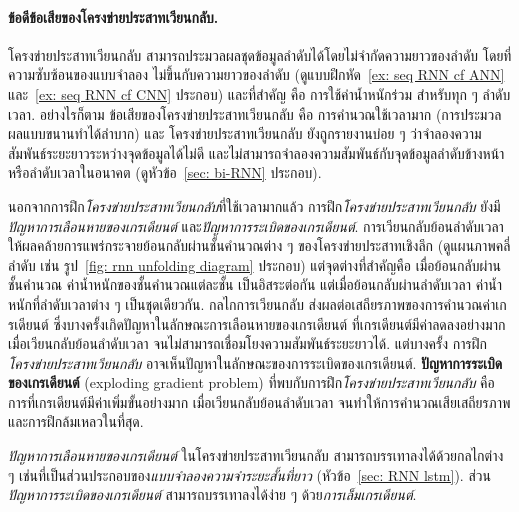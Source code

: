 \paragraph{ข้อดีข้อเสียของโครงข่ายประสาทเวียนกลับ.}
โครงข่ายประสาทเวียนกลับ
สามารถประมวลผลชุดข้อมูลลำดับได้โดยไม่จำกัดความยาวของลำดับ
โดยที่ความซับซ้อนของแบบจำลอง ไม่ขึ้นกับความยาวของลำดับ (ดูแบบฝึกหัด~\ref{ex: seq RNN cf ANN} และ~\ref{ex: seq RNN cf CNN} ประกอบ)
และที่สำคัญ คือ การใช้ค่าน้ำหนักร่วม สำหรับทุก ๆ ลำดับเวลา.
อย่างไรก็ตาม ข้อเสียของโครงข่ายประสาทเวียนกลับ 
คือ การคำนวณใช้เวลามาก (การประมวลผลแบบขนานทำได้ลำบาก)
และ
โครงข่ายประสาทเวียนกลับ 
ยังถูกรายงานบ่อย ๆ ว่าจำลองความสัมพันธ์ระยะยาวระหว่างจุดข้อมูลได้ไม่ดี
และไม่สามารถจำลองความสัมพันธ์กับจุดข้อมูลลำดับข้างหน้า หรือลำดับเวลาในอนาคต (ดูหัวข้อ~\ref{sec: bi-RNN} ประกอบ).

นอกจากการฝึก\textit{โครงข่ายประสาทเวียนกลับ}ที่ใช้เวลามากแล้ว
การฝึก\textit{โครงข่ายประสาทเวียนกลับ} 
ยังมี\textit{ปัญหาการเลือนหายของเกรเดียนต์}
และ\textit{ปัญหาการระเบิดของเกรเดียนต์}.
การเวียนกลับย้อนลำดับเวลา ให้ผลคล้ายการแพร่กระจายย้อนกลับผ่านชั้นคำนวณต่าง ๆ ของโครงข่ายประสาทเชิงลึก
(ดูแผนภาพคลี่ลำดับ เช่น รูป~\ref{fig: rnn unfolding diagram} ประกอบ)
แต่จุดต่างที่สำคัญคือ
เมื่อย้อนกลับผ่านชั้นคำนวณ ค่าน้ำหนักของชั้นคำนวณแต่ละชั้น เป็นอิสระต่อกัน
แต่เมื่อย้อนกลับผ่านลำดับเวลา ค่าน้ำหนักที่ลำดับเวลาต่าง ๆ เป็นชุดเดียวกัน.
%
กลไกการเวียนกลับ ส่งผลต่อเสถียรภาพของการคำนวณค่าเกรเดียนต์
ซึ่งบางครั้งเกิดปัญหาในลักษณะการเลือนหายของเกรเดียนต์
ที่เกรเดียนต์มีค่าลดลงอย่างมาก เมื่อเวียนกลับย้อนลำดับเวลา จนไม่สามารถเชื่อมโยงความสัมพันธ์ระยะยาวได้.
แต่บางครั้ง
การฝึก\textit{โครงข่ายประสาทเวียนกลับ}
อาจเห็นปัญหาในลักษณะของการระเบิดของเกรเดียนต์.
\textbf{ปัญหาการระเบิดของเกรเดียนต์} (exploding gradient problem)
ที่พบกับการฝึก\textit{โครงข่ายประสาทเวียนกลับ}
คือ
การที่เกรเดียนต์มีค่าเพิ่มขั้นอย่างมาก เมื่อเวียนกลับย้อนลำดับเวลา
จนทำให้การคำนวณเสียเสถียรภาพ และการฝึกล้มเหลวในที่สุด.

\textit{ปัญหาการเลือนหายของเกรเดียนต์}
ในโครงข่ายประสาทเวียนกลับ
สามารถบรรเทาลงได้ด้วยกลไกต่าง ๆ 
เช่นที่เป็นส่วนประกอบของ\textit{แบบจำลองความจำระยะสั้นที่ยาว} (หัวข้อ~\ref{sec: RNN lstm}).
ส่วน\textit{ปัญหาการระเบิดของเกรเดียนต์}
สามารถบรรเทาลงได้ง่าย ๆ ด้วย\textit{การเล็มเกรเดียนต์}.


